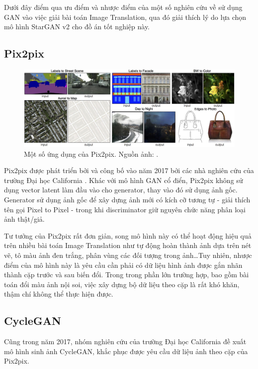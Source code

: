 \documentclass[12pt]{extreport}
\begin{document}
Dưới đây điểm qua ưu điểm và nhược điểm của một số nghiên cứu về sử dụng GAN vào việc giải bài toán Image Translation, qua đó giải thích lý do lựa chọn mô hình StarGAN v2 cho đồ án tốt nghiệp này.

\subsection{Pix2pix}

\begin{figure}[H]
    \centering
    \includegraphics[width=\textwidth]{figure14}
    \caption{Một số ứng dụng của Pix2pix. Nguồn ảnh: \cite{pix2pix2017}.}
\end{figure}

Pix2pix được phát triển bởi và công bố vào năm 2017 bởi các nhà nghiên cứu của trường Đại học California \cite{pix2pix2017}. Khác với mô hình GAN cổ điển, Pix2pix không sử dụng vector latent làm đầu vào cho generator, thay vào đó sử dụng ảnh gốc. Generator sử dụng ảnh gốc để xây dựng ảnh mới có kích cỡ tương tự - giải thích tên gọi Pixel to Pixel - trong khi discriminator giữ nguyên chức năng phân loại ảnh thật/giả.

Tư tưởng của Pix2pix rất đơn giản, song mô hình này có thể hoạt động hiệu quả trên nhiều bài toán Image Translation như tự động hoàn thành ảnh dựa trên nét vẽ, tô màu ảnh đen trắng, phân vùng các đối tượng trong ảnh\dots Tuy nhiên, nhược điểm của mô hình này là yêu cầu cần phải có dữ liệu hình ảnh được gắn nhãn thành cặp trước và sau biến đổi. Trong trong phần lớn trường hợp, bao gồm bài toán đổi màu ảnh nội soi, việc xây dựng bộ dữ liệu theo cặp là rất khó khăn, thậm chí không thể thực hiện được.

\subsection{CycleGAN}

Cũng trong năm 2017, nhóm nghiên cứu của trường Đại học California đề xuất mô hình sinh ảnh CycleGAN, khắc phục được yêu cầu dữ liệu ảnh theo cặp của Pix2pix.
\end{document}
